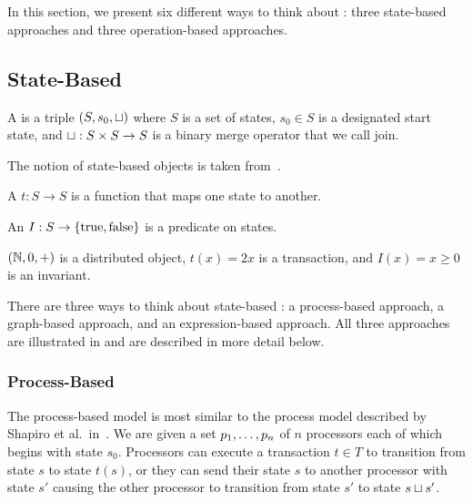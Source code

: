 \section{\Iconfluence{}}
In this section, we present six different ways to think about \Iconfluence{}:
three state-based approaches and three operation-based approaches.

\subsection{State-Based}
\begin{definition}
  A  is a triple $(S, s_0, \sqcup)$
  where $S$ is a set of states, $s_0 \in S$ is a designated start state, and
  $\sqcup: S \times S \to S$ is a binary merge operator that we call join.
\end{definition}

The notion of state-based objects is taken from~\cite{shapiro2011conflict}.

\begin{definition}
  A  $t: S \to S$ is a function that maps one
  state to another.
\end{definition}

\begin{definition}
  An  $I: S \to \{\text{true}, \text{false}\}$ is a
  predicate on states.
\end{definition}

\begin{example}
  $(\mathbb{N}, 0, +)$ is a distributed object, $t(x) = 2x$ is a transaction, and
  $I(x) = x \geq 0$ is an invariant.
\end{example}

There are three ways to think about state-based \Iconfluence{}: a process-based
approach, a graph-based approach, and an expression-based approach. All three
approaches are illustrated in  and are described in
more detail below.



\subsubsection{Process-Based}
The process-based model is most similar to the process model described by
Shapiro et al.\ in~\cite{shapiro2011conflict}. We are given a set
${p}_{1}, \ldots, {p}_{n}$ of $n$ processors each of which begins with state $s_0$.
Processors can execute a transaction $t \in T$ to transition from state $s$ to
state $t(s)$, or they can send their state $s$ to another processor with state
$s'$ causing the other processor to transition from state $s'$ to state $s
\sqcup s'$.

